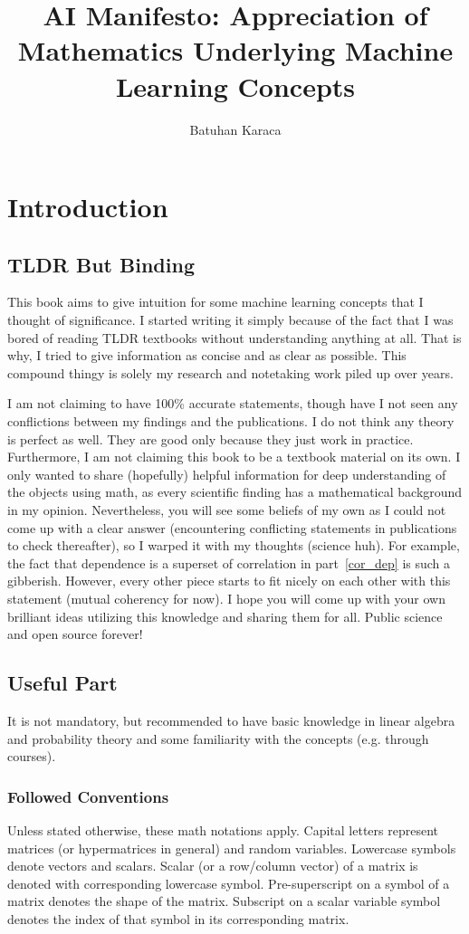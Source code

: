 \documentclass{article}
\title{AI Manifesto: Appreciation of Mathematics Underlying Machine Learning Concepts}
\author{Batuhan Karaca}
\numberwithin{equation}{subsection}
\begin{document}
\maketitle
\tableofcontents
\section{Introduction}
\subsection{TLDR But Binding}
This book aims to give intuition for some machine learning concepts that I thought of significance. I started writing it simply because of the fact that I was bored of reading TLDR textbooks without understanding anything at all. That is why, I tried to give information as concise and as clear as possible. This compound thingy is solely my research and notetaking work piled up over years. 

I am not claiming to have 100\% accurate statements, though have I not seen any conflictions between my findings and the publications. I do not think any theory is perfect as well. They are good only because they just work in practice. Furthermore, I am not claiming this book to be a textbook material on its own. I only wanted to share (hopefully) helpful information for deep understanding of the objects using math, as every scientific finding has a mathematical background in my opinion. Nevertheless, you will see some beliefs of my own as I could not come up with a clear answer (encountering conflicting statements in publications to check thereafter), so I warped it with my thoughts (science huh). For example, the fact that dependence is a superset of correlation in part~\ref{cor_dep} is such a gibberish. However, every other piece starts to fit nicely on each other with this statement (mutual coherency for now). I hope you will come up with your own brilliant ideas utilizing this knowledge and sharing them for all. Public science and open source forever!
\subsection{Useful Part}
It is not mandatory, but recommended to have basic knowledge in linear algebra and probability theory and some familiarity with the concepts (e.g. through courses). 
\subsubsection{Followed Conventions}
Unless stated otherwise, these math notations apply. Capital letters represent matrices (or hypermatrices in general) and random variables. Lowercase symbols denote vectors and scalars. Scalar (or a row/column vector) of a matrix is denoted with corresponding lowercase symbol. Pre-superscript on a symbol of a matrix denotes the shape of the matrix.  Subscript on a scalar variable symbol denotes the index of that symbol in its corresponding matrix.
\end{document}
